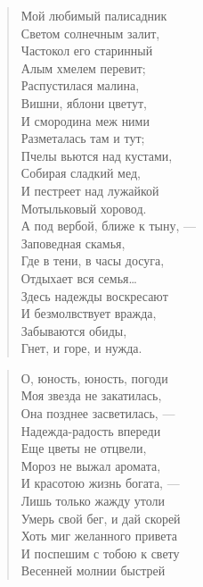 \newpage
\vspace*{0cm}

\begin{verse}
\begin{altverse}
Мой любимый палисадник\\
    Светом солнечным залит,\\
Частокол его старинный\\
    Алым хмелем перевит;\\
Распустилася малина,\\
    Вишни, яблони цветут,\\
И смородина меж ними\\
    Разметалась там и тут;\\
Пчелы вьются над кустами,\\
    Собирая сладкий мед,\\
И пестреет над лужайкой\\
	Мотыльковый хоровод.\\
А под вербой, ближе к тыну, ---\\
    Заповедная скамья,\\
Где в тени, в часы досуга,\\
    Отдыхает вся семья\ldots\\
Здесь надежды воскресают\\
    И безмолвствует вражда,\\
Забываются обиды,\\
    Гнет, и горе, и нужда.
\end{altverse}
\end{verse}

\newpage
\vspace*{0cm}




\begin{verse}
О, юность, юность, погоди\ldotse\\
Моя звезда не закатилась,\\
Она позднее засветилась, ---\\
Надежда-радость впереди\ldotse\\
Еще цветы не отцвели,\\
Мороз не выжал аромата,\\
И красотою жизнь богата, ---\\
Лишь только жажду утоли\ldotst\\
Умерь свой бег, и дай скорей\\
Хоть миг желанного привета\ldotst\\
И поспешим с тобою к свету\\
Весенней молнии быстрей\ldotst
\end{verse}

